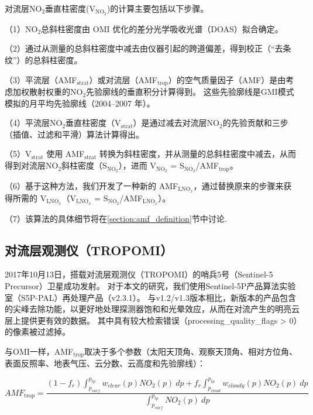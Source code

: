 对流层NO$_2$垂直柱密度(V$_{\textrm{NO$_2$}}$)的计算主要包括以下步骤。

（1）NO$_2$总斜柱密度由 OMI 优化的差分光学吸收光谱（DOAS）拟合确定。

（2）通过从测量的总斜柱密度中减去由仪器引起的跨道偏差，得到校正（“去条纹”）的总斜柱密度。

（3）平流层（AMF$_{\textrm{strat}}$）或对流层（AMF$_{\textrm{trop}}$）的空气质量因子（AMF）是由考虑加权散射权重的NO$_2$先验廓线的垂直积分计算得到。
这些先验廓线是GMI模式模拟的月平均先验廓线（2004--2007 年）。

（4）平流层NO$_2$垂直柱密度（V$_{\textrm{strat}}$）是通过减去对流层NO$_2$的先验贡献和三步（插值、过滤和平滑）算法计算得出\citep{Bucsela.2013}。

（5）V$_{\textrm{strat}}$ 使用 AMF$_{\textrm{strat}}$ 转换为斜柱密度，并从测量的总斜柱密度中减去，从而得到对流层NO$_2$斜柱密度（S$_{\textrm{NO$_2$}}$），进而 V$_{\textrm{NO$_2$}}$ = S$_{\textrm{NO$_2$}}$/AMF$_{\textrm{trop}}$。

（6）基于这种方法，我们开发了一种新的 AMF$_\textrm{LNO$_x$}$，通过替换原来的步骤来获得所需的 V$_\textrm{LNO$_x$}$（V$_\textrm{LNO$_x$}$ = S$_{\textrm{NO$_2$}}$/AMF$_\textrm{LNO$_x$}$）。

（7）该算法的具体细节将在\ref{section:amf_definition}节中讨论.

\subsection{对流层观测仪（TROPOMI）}

2017年10月13日，搭载对流层观测仪（TROPOMI）的哨兵5号（Sentinel-5 Precursor）卫星成功发射\citep{Veefkind.2012}。
对于本文的研究，我们使用Sentinel-5P产品算法实验室（S5P-PAL）再处理产品（v2.3.1）。
与v1.2/v1.3版本相比，新版本的产品包含的尖峰去除功能，以更好地处理探测器饱和和光晕效应，从而在对流产生的明亮云层上提供更有效的数据\citep{Ludewig.2020,VanGeffen.2022}。
其中具有较大检索错误（processing\_quality\_flags > 0）的像素被过滤掉。

与OMI一样，AMF$_{\textrm{trop}}$取决于多个参数（太阳天顶角、观察天顶角、相对方位角、表面反照率、地表气压、云分数、云高度和先验廓线）：

\begin{equation} \label{eq:AMF_NO2}
AMF_{\textrm{trop}} = \frac{(1-f_r) \int_{p_{surf}}^{p_{tp}} w_{clear}(p) NO_2(p) \: dp + f_r \int_{p_{cloud}}^{p_{tp}} w_{cloudy}(p) NO_2(p) \: dp}{\int_{p_{surf}}^{p_{tp}} NO_2(p) \: dp}
\end{equation}

